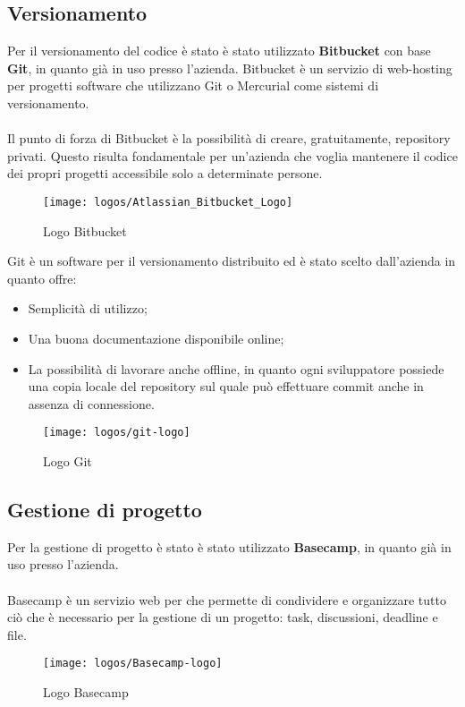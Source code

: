 \subsection{Versionamento}
Per il versionamento del codice è stato è stato utilizzato \textbf{Bitbucket} con base \textbf{Git}, in quanto già in uso presso l'azienda.
Bitbucket è un servizio di web-hosting per progetti software che utilizzano Git o Mercurial come sistemi di versionamento.
\\ \\
Il punto di forza di Bitbucket è la possibilità di creare, gratuitamente, repository privati. Questo risulta fondamentale per un'azienda che voglia mantenere il codice dei propri progetti accessibile solo a determinate persone.

\begin{figure}[htbp]
\begin{center}
\texttt{[image: logos/Atlassian\_Bitbucket\_Logo]}
\caption{Logo Bitbucket}
\end{center}
\end{figure}

Git è un software per il versionamento distribuito ed è stato scelto dall'azienda in quanto offre:
\begin{itemize}
	\item Semplicità di utilizzo;
	\item Una buona documentazione disponibile online;
	\item La possibilità di lavorare anche offline, in quanto ogni sviluppatore possiede una copia locale del repository sul quale può effettuare commit anche in assenza di connessione. 
\end{itemize} 

\begin{figure}[htbp]
\begin{center}
\texttt{[image: logos/git-logo]}
\caption{Logo Git}
\end{center}
\end{figure}

\subsection{Gestione di progetto}
Per la gestione di progetto è stato è stato utilizzato \textbf{Basecamp}, in quanto già in uso presso l'azienda.
\\ \\
Basecamp è un servizio web per che permette di condividere e organizzare tutto ciò che è necessario per la gestione di un progetto: task, discussioni, deadline e file.

\begin{figure}[htbp]
\begin{center}
\texttt{[image: logos/Basecamp-logo]}
\caption{Logo Basecamp}
\end{center}
\end{figure}